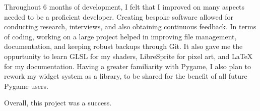 \documentclass[../main/main.tex]{subfiles}
\begin{document}
Throughout 6 months of development, I felt that I improved on many aspects needed to be a proficient developer. Creating bespoke software allowed for conducting research, interviews, and also obtaining continuous feedback. In terms of coding, working on a large project helped in improving file management, documentation, and keeping robust backups through Git. It also gave me the oppurtunity to learn GLSL for my shaders, LibreSprite for pixel art, and LaTeX for my documentation. Having a greater familiarity with Pygame, I also plan to rework my widget system as a library, to be shared for the benefit of all future Pygame users.

Overall, this project was a success.
\end{document}

